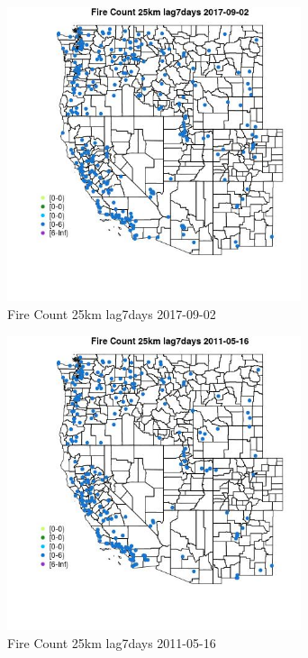 \begin{figure} 
\centering  
\includegraphics[width=0.77\textwidth]{Code_Outputs/Report_ML_input_PM25_Step4_part_e_de_duplicated_aves_compiled_2019-05-20wNAs_MapObsFire_Count_25km_lag7days2017-09-02.jpg} 
\caption{\label{fig:Report_ML_input_PM25_Step4_part_e_de_duplicated_aves_compiled_2019-05-20wNAsMapObsFire_Count_25km_lag7days2017-09-02}Fire Count 25km lag7days 2017-09-02} 
\end{figure} 
 

\begin{figure} 
\centering  
\includegraphics[width=0.77\textwidth]{Code_Outputs/Report_ML_input_PM25_Step4_part_e_de_duplicated_aves_compiled_2019-05-20wNAs_MapObsFire_Count_25km_lag7days2011-05-16.jpg} 
\caption{\label{fig:Report_ML_input_PM25_Step4_part_e_de_duplicated_aves_compiled_2019-05-20wNAsMapObsFire_Count_25km_lag7days2011-05-16}Fire Count 25km lag7days 2011-05-16} 
\end{figure} 
 

